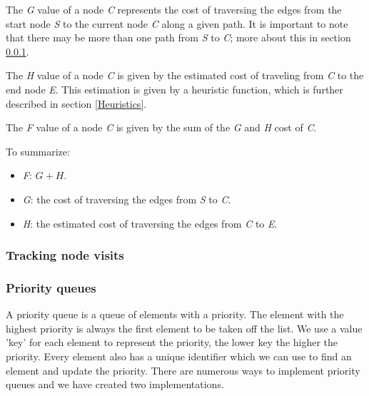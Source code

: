 \documentclass[12pt, a4paper]{article}
\begin{document}
The \textit{G} value of a node \textit{C} represents the cost of traversing the
edges from the start node \textit{S} to the current node \textit{C} along a
given path. It is important to note that there may be more than one path from
\textit{S} to \textit{C}; more about this in section \ref{Tracking node visits}.

The \textit{H} value of a node \textit{C} is given by the estimated cost of
traveling from \textit{C} to the end node \textit{E}. This estimation is given
by a heuristic function, which is further described in section \ref{Heuristics}.

The \textit{F} value of a node \textit{C} is given by the sum of the \textit{G}
and \textit{H} cost of \textit{C}.

To summarize:
\begin{itemize}
	\item \textit{F}: $ G + H $.
	\item \textit{G}: the cost of traversing the edges from \textit{S} to
	\textit{C}.
	\item \textit{H}: the estimated cost of traversing the edges from \textit{C}
	to \textit{E}.
\end{itemize}


\subsubsection{Tracking node visits}
\label{Tracking node visits}



\subsubsection{Priority queues}
A priority queue is a queue of elements with a priority. The element with the highest priority is always the first element to be taken off the list. We use a value 'key'  for each element to represent the priority, the lower key the higher the priority. Every element also has a unique identifier which we can use to find an element and update the priority.  There are numerous ways to implement priority queues and we have created two implementations.
\end{document}
